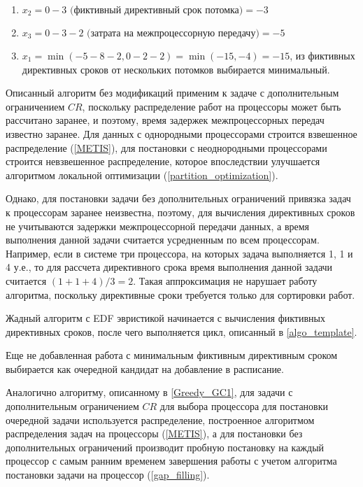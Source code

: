\begin{enumerate}
    \item $x_2 = 0 - 3 \text{ (фиктивный директивный срок потомка)} = -3$
    \item $x_3 = 0 - 3 - 2 \text{ (затрата на межпроцессорную передачу)} = -5$
    \item $x_1 = \min \left(- 5 - 8 - 2, 0 - 2 - 2\right) = \min \left(-15, -4\right) = -15$, из фиктивных директивных сроков от нескольких потомков выбирается минимальный.
\end{enumerate}

Описанный алгоритм без модификаций применим к задаче с дополнительным ограничением $CR$, поскольку распределение работ на процессоры может быть рассчитано заранее, и поэтому, время задержек межпроцессорных передач известно заранее. Для данных с однородными процессорами строится взвешенное распределение (\ref{METIS}), для постановки с неоднородными процессорами строится невзвешенное распределение, которое впоследствии улучшается алгоритмом локальной оптимизации (\ref{partition_optimization}).

Однако, для постановки задачи без дополнительных ограничений привязка задач к процессорам заранее неизвестна, поэтому, для вычисления директивных сроков не учитываются задержки межпроцессорной передачи данных, а время выполнения данной задачи считается усредненным по всем процессорам. Например, если в системе три процессора, на которых задача выполняется 1, 1 и 4 у.е., то для рассчета директивного срока время выполнения данной задачи считается $(1+1+4)/3 = 2$. Такая аппроксимация не нарушает работу алгоритма, поскольку директивные сроки требуется только для сортировки работ.

Жадный алгоритм с EDF эвристикой начинается с вычисления фиктивных директивных сроков, после чего выполняется цикл, описанный в \ref{algo_template}.

Еще не добавленная работа с минимальным фиктивным директивным сроком выбирается как очередной кандидат на добавление в расписание.

Аналогично алгоритму, описанному в \ref{Greedy_GC1}, для задачи с дополнительным ограничением $CR$ для выбора процессора для постановки очередной задачи используется распределение, построенное алгоритмом распределения задач на процессоры (\ref{METIS}), а для постановки без дополнительных ограничений производит пробную постановку на каждый процессор с самым ранним временем завершения работы с учетом алгоритма постановки задачи на процессор (\ref{gap_filling}).

